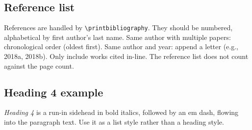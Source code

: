 \documentclass[
	letterpaper, %
]{jdf}
\begin{document}
\subsection*{Reference list}

References are handled by \verb|\printbibliography|. They should be numbered, alphabetical by first author's last name. Same author with multiple papers: chronological order (oldest first). Same author and year: append a letter (e.g., 2018a, 2018b). Only include works cited in-line. The reference list does not count against the page count.

\subsection*{Heading 4 example}

\emph{Heading 4} is a run-in sidehead in bold italics, followed by an em dash, flowing into the paragraph text. Use it as a list style rather than a heading style.
\end{document}
